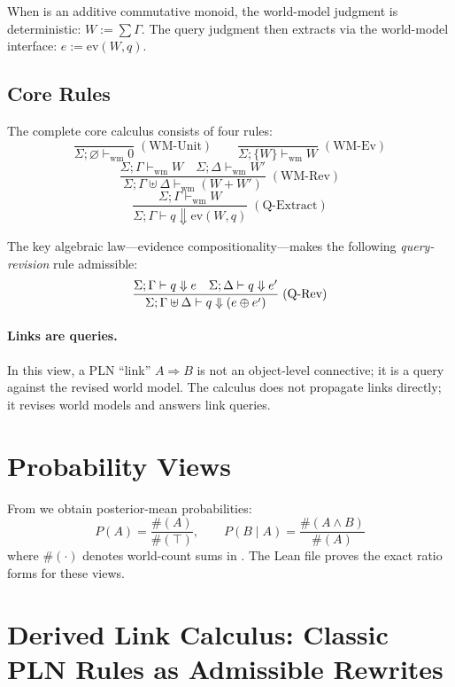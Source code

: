 \documentclass[11pt,openany]{report}
\begin{document}
When  is an additive commutative monoid, the world-model
judgment is deterministic: $W := \sum \Gamma$.  The query judgment then
extracts via the world-model interface: $e := \mathrm{ev}(W, q)$.

\subsection{Core Rules}

The complete core calculus consists of four rules:
\[
\frac{}{\Sigma; \varnothing \vdash_{\mathrm{wm}} 0}
\;(\text{WM-Unit})
\qquad
\frac{}{\Sigma; \{W\} \vdash_{\mathrm{wm}} W}
\;(\text{WM-Ev})
\]
\[
\frac{\Sigma; \Gamma \vdash_{\mathrm{wm}} W \quad
      \Sigma; \Delta \vdash_{\mathrm{wm}} W'}
     {\Sigma; \Gamma \uplus \Delta \vdash_{\mathrm{wm}} (W + W')}
\;(\text{WM-Rev})
\]
\[
\frac{\Sigma; \Gamma \vdash_{\mathrm{wm}} W}
     {\Sigma; \Gamma \vdash q \Downarrow \mathrm{ev}(W, q)}
\;(\text{Q-Extract})
\]

The key algebraic law---evidence compositionality---makes the following
\emph{query-revision} rule admissible:
\[
\frac{\Sigma; \Gamma \vdash q \Downarrow e \quad
      \Sigma; \Delta \vdash q \Downarrow e'}
     {\Sigma; \Gamma \uplus \Delta \vdash q \Downarrow (e \oplus e')}
\;(\text{Q-Rev})
\]

\paragraph{Links are queries.}
In this view, a PLN ``link'' $A \Rightarrow B$ is not an object-level
connective; it is a query  against the revised world model.
The calculus does not propagate links directly; it revises world models and
answers link queries.

\section{Probability Views}

From \Evidence{} we obtain posterior-mean probabilities:
\[
  P(A) = \frac{\#(A)}{\#(\top)}, \qquad
  P(B \mid A) = \frac{\#(A \wedge B)}{\#(A)}
\]
where $\#(\cdot)$ denotes world-count sums in \JointEvidence{}.  The Lean
file  proves
the exact ratio forms for these views.

\section{Derived Link Calculus: Classic PLN Rules as Admissible Rewrites}
\end{document}
